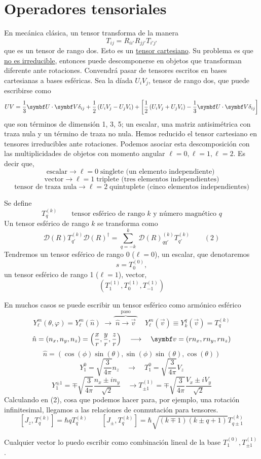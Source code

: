 \documentclass[10pt,oneside]{CBFT_book}
\begin{document}
\section{Operadores tensoriales}

En mecánica clásica, un tensor transforma de la manera
\[
	T_{ij} = R_{ii'} R_{jj'} T_{i' j'}
\]
que es un tensor de rango dos. Esto es un \underline{tensor cartesiano}. Su problema es que \underline{no es 
irreducible}, entonces puede descomponerse en objetos que transforman diferente ante rotaciones.
Convendrá pasar de tensores escritos en bases cartesianas a bases esféricas.
Sea la díada $U_iV_j$, tensor de rango dos, que puede escribirse como 
\[
	UV = \frac{1}{3}\vb{U}\cdot\vb{V}\delta_{ij} + \frac{1}{2}\left( U_iV_j - U_jV_i \right) +
	\left[ \frac{1}{2}\left( U_iV_j + U_jV_i \right) - \frac{1}{3}\vb{U}\cdot\vb{V}\delta_{ij}\right]
\]
que son términos de dimensión 1, 3, 5; un escalar, una matriz antisimétrica con traza nula y un término
de traza no nula.
Hemos reducido el tensor cartesiano en tensores irreducibles ante rotaciones. 
Podemos asociar esta descomposición con las multiplicidades de objetos con momento angular 
$\ell=0, \ell=1, \ell=2$. Es decir que,
\[
	\text{escalar} \longrightarrow \ell=0 \; \text{singlete (un elemento independiente) }
\]
\[
	\text{vector} \longrightarrow \ell=1 \; \text{triplete (tres elementos independientes)}
\]
\[
	\text{tensor de traza nula} \longrightarrow \ell=2 \; \text{quintuplete (cinco elementos 
independientes)}
\]

Se define 
\[
	T^{(k)}_q \qquad \text{tensor esférico de rango $k$ y número magnético $q$}
\]
Un tensor esférico de rango $k$ se transforma como 
\[
	\mathcal{D}(R) T_{q'}^{(k)} \mathcal{D}(R)^\dagger = 
	\sum_{q=-k}^k \: \mathcal{D}(R)_{qq'}^{(k)} T_{q'}^{(k)}  \qquad (2)
\]
Tendremos un tensor esférico de rango 0 ($\ell=0$), un escalar, que denotaremos
\[
	s = T^{(0)}_0, 
\]
un tensor esférico de rango 1 ($\ell=1$), vector,
\[
	(T^{(1)}_1,T^{(1)}_0,T^{(1)}_{-1})
\]

En muchos casos se puede escribir un tensor esférico como armónico esférico 
\[
	Y_\ell^{m}(\theta,\varphi) = Y_\ell^{m}(\hat{n}) \; \longrightarrow 
	\overbrace{ \phantom{.}\hat{n} \longrightarrow \vec{v}\phantom{.}}^{\text{paso}} \quad
	Y_\ell^m(\vec{v}) \equiv Y_k^q(\vec{v}) = T_q^{(k)}
\]
\[
	\hat{n} = (n_x,n_y,n_z) = \left( \frac{x}{r}, \frac{y}{r}, \frac{z}{r} \right) \quad 
	\longrightarrow \quad \vb{v} = (rn_x,rn_y,rn_z)
\]
\[
	\hat{n} = ( \cos(\phi)\sin(\theta), \sin(\phi)\sin(\theta), \cos(\theta))
\]
\[
	Y_1^0 = \sqrt{\frac{3}{4\pi}}n_z \quad \longrightarrow \quad T_1^0 = \sqrt{\frac{3}{4\pi}}V_z
\]
\[
	Y_1^{\pm 1} = \mp \sqrt{\frac{3}{4\pi}} \frac{n_x \pm i n_y}{\sqrt{2}} \quad \longrightarrow
	T_{\pm 1}^{(1)} = \mp \sqrt{\frac{3}{4\pi}} \frac{V_x \pm i V_y}{\sqrt{2}}
\]
Calculando en (2), cosa que podemos hacer para, por ejemplo, una rotación infinitesimal, llegamos a las 
relaciones de conmutación para tensores.
\[
	[ J_z, T_q^{(k)} ] = \hbar q T_q^{(k)} \qquad 
	[J_{\pm},T_q^{(k)}] = \hbar \sqrt{(k\mp 1)(k\pm q + 1)} T_{q\pm 1}^{(k)}
\]

Cualquier vector lo puedo escribir como combinación lineal de la base $T_1^{(0)}, T_{\pm 1}^{(1)}$.

\end{document}
